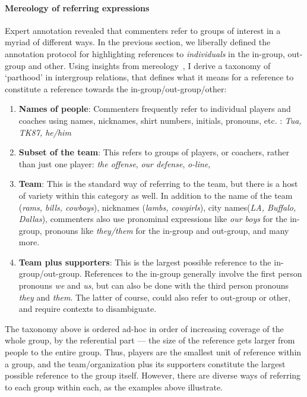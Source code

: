 \paragraph{Mereology of referring expressions} Expert annotation revealed that commenters refer to groups of interest in a myriad of different ways. In the previous section, we liberally defined the annotation protocol for highlighting references to \emph{individuals} in the in-group, out-group and other. Using insights from mereology~\citep{sep-mereology}, I derive a taxonomy of `parthood' in intergroup relations, that defines what it means for a reference to constitute a reference towards the in-group/out-group/other:

\begin{enumerate}
    \item \textbf{Names of people}: Commenters frequently refer to individual players and coaches using names, nicknames, shirt numbers, initials, pronouns, etc. : \emph{Tua, TK87, he/him\textellipsis}
    \item \textbf{Subset of the team}: This refers to groups of players, or coachers, rather than just one player: \emph{the offense}, \emph{our defense}, \emph{o-line}, \textellipsis
    \item \textbf{Team}: This is the standard way of referring to the team, but there is a host of variety within this category as well. In addition to the name of the team (\emph{rams, bills, cowboys}), nicknames (\emph{lambs, cowgirls}), city names(\emph{LA, Buffalo, Dallas}), commenters also use pronominal expressions like \emph{our boys} for the in-group, pronouns like \emph{they/them} for the in-group and out-group, and many more.
    \item \textbf{Team plus supporters}: This is the largest possible reference to the in-group/out-group. References to the in-group generally involve the first person pronouns \emph{we} and \emph{us}, but can also be done with the third person pronouns \emph{they} and \emph{them}. The latter of course, could also refer to out-group or other, and require contexts to disambiguate.
\end{enumerate}

The taxonomy above is ordered ad-hoc in order of increasing coverage of the whole group, by the referential part --- the size of the reference gets larger from people to the entire group. Thus, players are the smallest unit of reference within a group, and the team/organization plus its supporters constitute the largest possible reference to the group itself. However, there are diverse ways of referring to each group within each, as the examples above illustrate.

